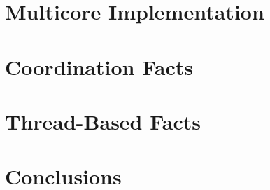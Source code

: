 \documentclass[12pt]{cmuthesis}
\theoremstyle{indented}
\begin{document}
\chapter{Multicore Implementation}\label{chapter:implementation}


\chapter{Coordination Facts}\label{chapter:coordination}


\chapter{Thread-Based Facts}\label{chapter:threads}


\chapter{Conclusions}


\appendix


\backmatter


\renewcommand{\bibsection}{\chapter{\bibname}}

\end{document}
